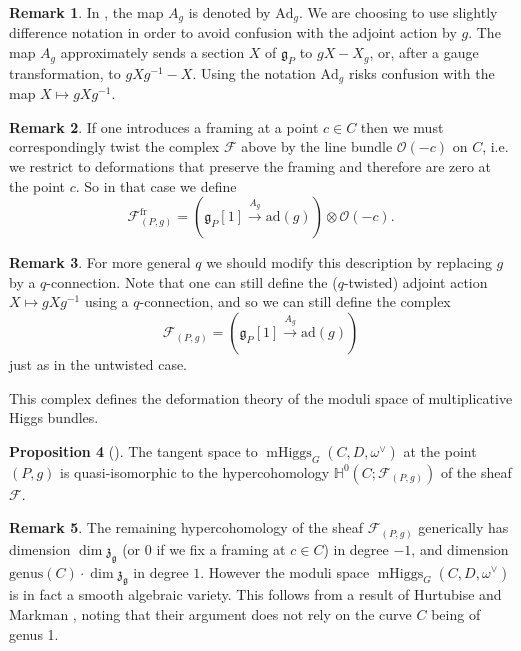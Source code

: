 \documentclass[11pt, oneside, reqno]{amsart}
\theoremstyle{definition} \newtheorem{definition}{Definition}[section]
\newtheorem{prop}[definition]{Proposition}
\theoremstyle{definition} \newtheorem{remark}[definition]{Remark}
\theoremstyle{definition} \newtheorem{remarks}[definition]{Remarks}
\theoremstyle{definition} \newtheorem{question}[definition]{Question}
\theoremstyle{definition} \newtheorem*{note}{Note}
\theoremstyle{definition} \newtheorem{example}[definition]{Example}
\theoremstyle{definition} \newtheorem{examples}[definition]{Examples}
\renewcommand{\gg}{\mathfrak{g}}
\newcommand{\bb}[1]{\mathbb{#1}}
\newcommand{\mr}[1]{\mathrm{#1}}
\newcommand{\mc}[1]{\mathcal{#1}}
\newcommand{\mf}[1]{\mathfrak{#1}}
\newcommand{\OO}{\mathcal{O}}
\DeclareMathOperator{\mhiggs}{mHiggs}
\newcommand{\fr}{\mathrm{fr}}
\newcommand{\ad}{\mr{ad}}
\newcommand{\Ad}{\mr{Ad}}
\begin{document}
\begin{remark}
In \cite{HurtubiseMarkman}, the map $A_g$ is denoted by $\Ad_g$.  We are choosing to use slightly difference notation in order to avoid confusion with the adjoint action by $g$.  The map $A_g$ approximately sends a section $X$ of $\gg_P$ to $gX - X_g$, or, after a gauge transformation, to $gXg^{-1} - X$.  Using the notation $\Ad_g$ risks confusion with the map $X \mapsto gXg^{-1}$.
\end{remark}

\begin{remark}
If one introduces a framing at a point $c \in C$ then we must correspondingly twist the complex $\mc F$ above by the line bundle $\OO(-c)$ on $C$, i.e. we restrict to deformations that preserve the framing and therefore are zero at the point $c$.  So in that case we define
\[\mc F^\fr_{(P,g)} = (\gg_P[1] \overset {A_g} {\to} \ad(g)) \otimes \OO(-c).\]
\end{remark}

\begin{remark}
For more general $q$ we should modify this description by replacing $g$ by a $q$-connection.  Note that one can still define the ($q$-twisted) adjoint action $X \mapsto g X g^{-1}$ using a $q$-connection, and so we can still define the complex
\[\mc F_{(P,g)} = (\gg_P[1] \overset {A_g} {\to} \ad(g))\]
just as in the untwisted case.
\end{remark}

This complex defines the deformation theory of the moduli space of multiplicative Higgs bundles.

\begin{prop}[{\cite[Proposition 3.1.3]{Bottacin}}]
The tangent space to $\mhiggs_G(C, D, \omega^\vee)$ at the point $(P,g)$ is quasi-isomorphic to the hypercohomology $\bb H^0(C; \mc F_{(P,g)})$ of the sheaf $\mc F$.
\end{prop}

\begin{remark}
The remaining hypercohomology of the sheaf $\mc F_{(P,g)}$ generically has dimension $\dim \mf z_{\gg}$ (or 0 if we fix a framing at $c \in C$) in degree $-1$, and dimension $\mr{genus}(C) \cdot \dim \mf z_{\gg}$ in degree $1$.  However the moduli space $\mhiggs_G(C, D,\omega^\vee)$ is in fact a smooth algebraic variety.  This follows from a result of Hurtubise and Markman \cite[Theorem 4.13]{HurtubiseMarkman}, noting that their argument does not rely on the curve $C$ being of genus 1.
\end{remark}
\end{document}
